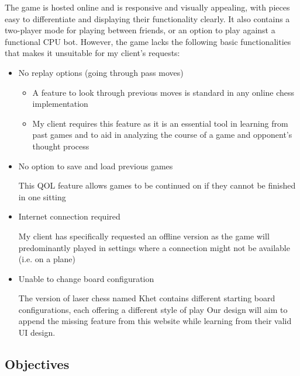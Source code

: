 \documentclass{article}
\begin{document}
The game is hosted online and is responsive and visually appealing, with pieces easy to differentiate and displaying their functionality clearly. It also contains a two-player mode for playing between friends, or an option to play against a functional CPU bot. However, the game lacks the following basic functionalities that makes it unsuitable for my client’s requests:

\begin{itemize}
\item No replay options (going through pass moves)
    \begin{itemize}
    \item A feature to look through previous moves is standard in any online chess implementation
    \item My client requires this feature as it is an essential tool in learning from past games and to aid in analyzing the course of a game and opponent’s thought process
    \end{itemize}
\item No option to save and load previous games
    \begin{itemize}
    This QOL feature allows games to be continued on if they cannot be finished in one sitting
    \end{itemize}
\item Internet connection required
    \begin{itemize}
    My client has specifically requested an offline version as the game will predominantly played in settings where a connection might not be available (i.e. on a plane)
    \end{itemize}
\item Unable to change board configuration
    \begin{itemize}
    The version of laser chess named Khet contains different starting board configurations, each offering a different style of play
    Our design will aim to append the missing feature from this website while learning from their valid UI design.
    \end{itemize}
\end{itemize}

\subsection{Objectives}
\end{document}
